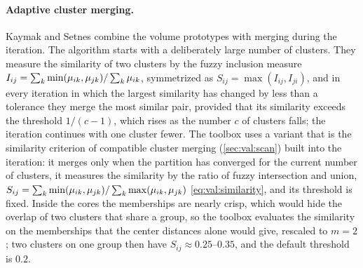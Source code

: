 \paragraph{Adaptive cluster merging.} Kaymak and Setnes combine the volume prototypes with merging during the iteration. The algorithm starts with a deliberately large number of clusters. They measure the similarity of two clusters by the fuzzy inclusion measure $I_{ij}=\sum_k\min(\mu_{ik},\mu_{jk})/\sum_k\mu_{ik}$, symmetrized as $S_{ij}=\max(I_{ij},I_{ji})$, and in every iteration in which the largest similarity has changed by less than a tolerance they merge the most similar pair, provided that its similarity exceeds the threshold $1/(c-1)$, which rises as the number $c$ of clusters falls; the iteration continues with one cluster fewer. The toolbox uses a variant that is the similarity criterion of compatible cluster merging (\cref{sec:val:scan}) built into the iteration: it merges only when the partition has converged for the current number of clusters, it measures the similarity by the ratio of fuzzy intersection and union, $S_{ij}=\sum_k\min(\mu_{ik},\mu_{jk})/\sum_k\max(\mu_{ik},\mu_{jk})$ \eqref{eq:val:similarity}, and its threshold is fixed. Inside the cores the memberships are nearly crisp, which would hide the overlap of two clusters that share a group, so the toolbox evaluates the similarity on the memberships that the center distances alone would give, rescaled to $m=2$; two clusters on one group then have $S_{ij}\approx0.25$--$0.35$, and the default threshold is $0.2$.

